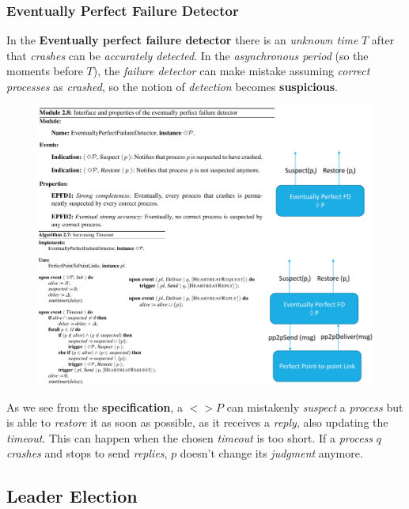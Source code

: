\documentclass{article}
\begin{document}
\subsubsection{Eventually Perfect Failure Detector}
In the \textbf{Eventually perfect failure detector} there is an \emph{unknown time} $T$ after that \emph{crashes} can be \emph{accurately detected}. In the \emph{asynchronous period} (so the moments before $T$), the \emph{failure detector} can make mistake assuming \emph{correct processes} as \emph{crashed}, so the notion of \emph{detection} becomes \textbf{suspicious}.
\begin{figure}[H]
  \centering
  \includegraphics[scale=0.5, left]{cattura20.png}
\end{figure}
\hfill \break
As we see from the \textbf{specification}, a $<>P$ can mistakenly \emph{suspect} a \emph{process} but is able to \emph{restore} it as soon as possible, as it receives a \emph{reply}, also updating the \emph{timeout}. This can happen when the chosen \emph{timeout} is too short. If a \emph{process} $q$ \emph{crashes} and stops to send \emph{replies}, $p$ doesn't change its \emph{judgment} anymore. 
\clearpage
\subsection{Leader Election}
\end{document}
